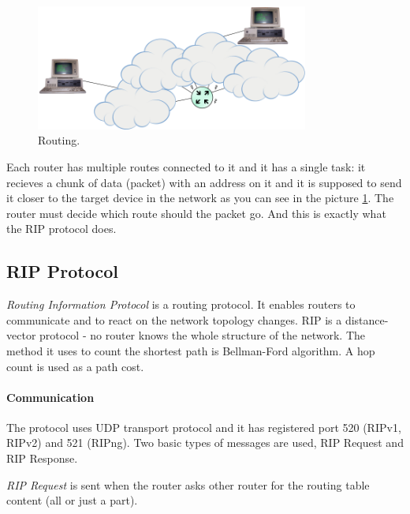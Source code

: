 \documentclass[10pt,a4paper,titlepage]{article}
\begin{document}
            \begin{figure}[h!]
                \begin{center}
                    \includegraphics[width=0.80\textwidth]{routing.png}
                    \caption{ Routing. \label{fig:routing}}
                \end{center}
            \end{figure}

            Each router has multiple routes connected to it and it has a single task: it recieves
            a chunk of data (packet) with an address on it and it is supposed to send it closer to
            the target device in the network as you can see in the picture \ref{fig:routing}.
            The router must decide which route should the packet go. And this is exactly what the
            RIP protocol does. 
    
        \subsection*{RIP Protocol}
            {\it Routing Information Protocol} is a routing protocol. It enables routers to communicate and to react
            on the network topology changes. RIP is a distance-vector protocol - no router knows the whole structure
            of the network. The method it uses to count the shortest path is Bellman-Ford algorithm. A hop count
            is used as a path cost.

            \paragraph{Communication}
            The protocol uses UDP transport protocol and it has registered port 520 (RIPv1, RIPv2) and 521 (RIPng).
            Two basic types of messages are used, RIP Request and RIP Response.

            {\it RIP Request} is sent when the router asks other router for the routing table content (all or just a part).
\end{document}
